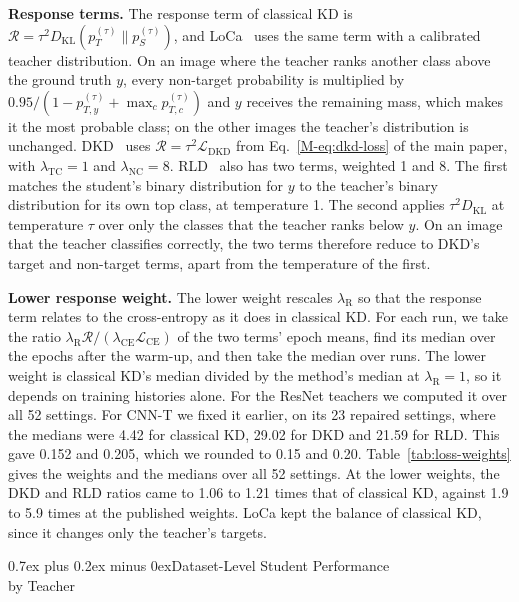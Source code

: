 \documentclass[10pt,journal,compsoc]{IEEEtran}
\makeatletter
\def\section{\@startsection{section}{1}{\z@}{-3.5ex plus -0.5ex minus -1.5ex}%
{0.7ex plus 0.2ex minus 0ex}{\normalfont\sublargesize\sffamily\bfseries\scshape}}
\theoremstyle{definition}
\makeatother
\begin{document}
\textbf{Response terms.} The response term of classical KD is
$\mathcal R=\tau^2D_{\mathrm{KL}}(p_T^{(\tau)}\|p_S^{(\tau)})$, and
LoCa~\cite{yang2024loca} uses the same term with a calibrated teacher
distribution. On an image where the teacher ranks another class above
the ground truth $y$, every non-target probability is multiplied by
$0.95/(1-p_{T,y}^{(\tau)}+\max_c p_{T,c}^{(\tau)})$ and $y$ receives
the remaining mass, which makes it the most probable class; on the
other images the teacher's distribution is unchanged.
DKD~\cite{zhao2022decoupled} uses $\mathcal R=\tau^2\mathcal
L_{\mathrm{DKD}}$ from Eq.~\eqref{M-eq:dkd-loss} of the main paper, with
$\lambda_{\mathrm{TC}}=1$ and $\lambda_{\mathrm{NC}}=8$.
RLD~\cite{sun2025knowledge} also has two terms, weighted 1 and 8. The
first matches the student's binary distribution for $y$ to the
teacher's binary distribution for its own top class, at temperature 1.
The second applies $\tau^2D_{\mathrm{KL}}$ at temperature $\tau$ over
only the classes that the teacher ranks below $y$. On an image that the
teacher classifies correctly, the two terms therefore reduce to DKD's
target and non-target terms, apart from the temperature of the first.

\textbf{Lower response weight.} The lower weight rescales
$\lambda_{\mathrm R}$ so that the response term relates to the
cross-entropy as it does in classical KD. For each run, we take the
ratio $\lambda_{\mathrm R}\mathcal R/(\lambda_{\mathrm{CE}}\mathcal
L_{\mathrm{CE}})$ of the two terms' epoch means, find its median over
the epochs after the warm-up, and then take the median over runs. The
lower weight is classical KD's median divided by the method's median at
$\lambda_{\mathrm R}=1$, so it depends on training histories alone. For
the ResNet teachers we computed it over all 52 settings. For CNN-T we
fixed it earlier, on its 23 repaired settings, where the medians were
4.42 for classical KD, 29.02 for DKD and 21.59 for RLD. This gave 0.152
and 0.205, which we rounded to 0.15 and 0.20.
Table~\ref{tab:loss-weights} gives the weights and the medians over all
52 settings. At the lower weights, the DKD and RLD ratios came to 1.06
to 1.21 times that of classical KD, against 1.9 to 5.9 times at the
published weights. LoCa kept the balance of classical KD, since it
changes only the teacher's targets.

\section{Dataset-Level Student Performance\\by Teacher}
\label{app:dataset-student-outcomes}
\end{document}
